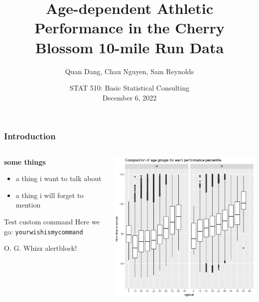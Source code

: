 \documentclass{beamer}
\title[
	Cherry Blossom
]{
	Age-dependent Athletic Performance in the
	Cherry Blossom 10-mile Run Data
}
\author[S. Reynolds]{
	\large{
		Quan Dang,\inst{1}
		Chau Nguyen,\inst{1}
		Sam Reynolds\inst{1}
	}
}
\institute[PSU]{
	\inst{1}
	Portland State University, Portland, Oregon
}
\date[STAT 510]{
	STAT 510: Basic Statistical Consulting
	\\[3mm]
	December 6, 2022
}
\theoremstyle{definition}
\theoremstyle{remark}
\newcommand{\foo}{\texttt{yourwishismycommand}}
\begin{document}
\addtocounter{framenumber}{-1}

\begin{frame}
	\titlepage
\end{frame}

\begin{frame}

	\frametitle{Introduction}

	\begin{columns}

		\begin{column}{0.6\textwidth}
			\textbf{some things}
			\begin{itemize}
				\item a thing i want to talk about
				\item a thing i will forget to mention
			\end{itemize}
			\begin{block}{Test custom command}
				Here we go: \foo
			\end{block}
			\begin{alertblock}{O. G. Whizz}
				alertblock!
			\end{alertblock}
		\end{column}

		\begin{column}{0.4\textwidth}
			\begin{center}
				\includegraphics[width=0.9\linewidth]
				{../figure/boxplot_runtime_age-1.png}
			\end{center}
		\end{column}

	\end{columns}

\end{frame}
\end{document}

